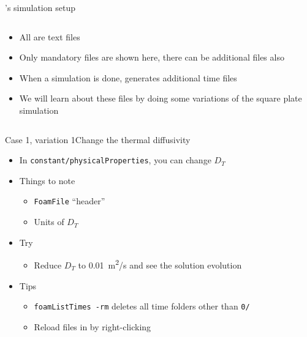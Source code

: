 \begin{frame}{\openfoam's simulation setup}
\begin{columns}
\begin{column}{0.5\linewidth}
\begin{itemize}
                \item All are text files
                \item Only mandatory files are shown here, there can be additional files also
                \item When a simulation is done, \openfoam{} generates additional time files
                \item We will learn about these files by doing some variations of the square plate simulation
            \end{itemize}
        \end{column}
    \end{columns}
\end{frame}

\begin{frame}{Case 1, variation 1}{Change the thermal diffusivity}
    \begin{itemize}
        \setitemsep{1em}
        \item In \texttt{constant/physicalProperties}, you can change $D_T$
        \item Things to note
        \begin{itemize}
            \item \texttt{FoamFile} ``header''
            \item Units of $D_T$
        \end{itemize}
        \item Try
        \begin{itemize}
            \item Reduce $D_T$ to \qty{0.01}{m^2/s} and see the solution evolution
        \end{itemize}
        \item Tips
        \begin{itemize}
            \item \texttt{foamListTimes -rm} deletes all time folders other than \texttt{0/}
            \item Reload files in \paraview{} by right-clicking
        \end{itemize}
    \end{itemize}
\end{frame}

